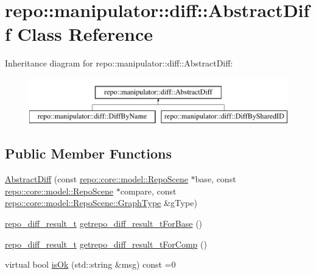 \hypertarget{classrepo_1_1manipulator_1_1diff_1_1_abstract_diff}{}\section{repo\+:\+:manipulator\+:\+:diff\+:\+:Abstract\+Diff Class Reference}
\label{classrepo_1_1manipulator_1_1diff_1_1_abstract_diff}
Inheritance diagram for repo\+:\+:manipulator\+:\+:diff\+:\+:Abstract\+Diff\+:\begin{figure}[H]
\begin{center}
\leavevmode
\includegraphics[height=2.000000cm]{classrepo_1_1manipulator_1_1diff_1_1_abstract_diff}
\end{center}
\end{figure}
\subsection*{Public Member Functions}
\begin{DoxyCompactItemize}
\item 
\hyperlink{classrepo_1_1manipulator_1_1diff_1_1_abstract_diff_a749b6fb18947b6bf78e6b1a59917ef86}{Abstract\+Diff} (const \hyperlink{classrepo_1_1core_1_1model_1_1_repo_scene}{repo\+::core\+::model\+::\+Repo\+Scene} $\ast$base, const \hyperlink{classrepo_1_1core_1_1model_1_1_repo_scene}{repo\+::core\+::model\+::\+Repo\+Scene} $\ast$compare, const \hyperlink{classrepo_1_1core_1_1model_1_1_repo_scene_aefcacd6eb4c7774ac1bfe3a6b223337c}{repo\+::core\+::model\+::\+Repo\+Scene\+::\+Graph\+Type} \&g\+Type)
\item 
\hyperlink{structrepo__diff__result__t}{repo\+\_\+diff\+\_\+result\+\_\+t} \hyperlink{classrepo_1_1manipulator_1_1diff_1_1_abstract_diff_aac1a749709ed41868bdcce6277a1039a}{getrepo\+\_\+diff\+\_\+result\+\_\+t\+For\+Base} ()
\item 
\hyperlink{structrepo__diff__result__t}{repo\+\_\+diff\+\_\+result\+\_\+t} \hyperlink{classrepo_1_1manipulator_1_1diff_1_1_abstract_diff_a1393fd4cade1766b43d2644990efbf14}{getrepo\+\_\+diff\+\_\+result\+\_\+t\+For\+Comp} ()
\item 
virtual bool \hyperlink{classrepo_1_1manipulator_1_1diff_1_1_abstract_diff_a0c1780f099a434120e65835bd1514ebf}{is\+Ok} (std\+::string \&msg) const =0
\end{DoxyCompactItemize}
